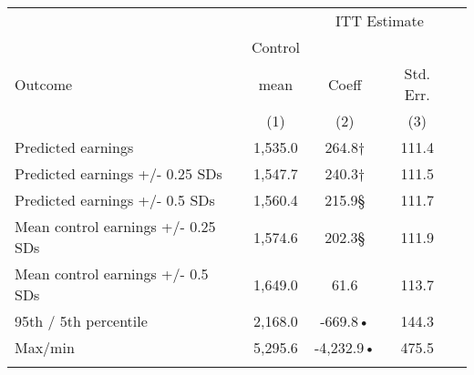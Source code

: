\begin{tabular}{lcccc}
\hline \noalign{\smallskip} &  & \multicolumn{2}{c}{{ ITT Estimate}} & \\
\cline{3-4} & Control &  &  & \\
Outcome & mean & Coeff & Std. Err. & \\
 & (1) & (2) & (3) & \\
\noalign{\smallskip}\hline \noalign{\smallskip}Predicted earnings & 1,535.0 & 264.8† & 111.4 & \\
Predicted earnings +/- 0.25 SDs & 1,547.7 & 240.3† & 111.5 & \\
Predicted earnings +/- 0.5 SDs & 1,560.4 & 215.9§ & 111.7 & \\
Mean control earnings +/- 0.25 SDs & 1,574.6 & 202.3§ & 111.9 & \\
Mean control earnings +/- 0.5 SDs & 1,649.0 & 61.6 & 113.7 & \\
95th / 5th percentile & 2,168.0 & -669.8• & 144.3 & \\
Max/min & 5,295.6 & -4,232.9• & 475.5 & \\
\noalign{\smallskip}\hline\end{tabular}\\
